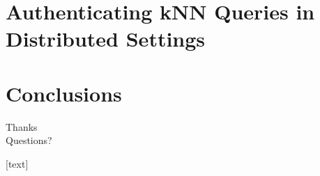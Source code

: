 \documentclass[xcolor={dvipsnames},aspectratio=169,10pt]{beamer}
\begin{document}
\section{Authenticating {kNN} Queries in Distributed Settings}

\section{Conclusions}

\begin{frame}[standout]
  Thanks \\
  Questions?
\end{frame}

\appendix%

\begingroup
{}
\begin{frame}[t,allowframebreaks]{\refname}
  [text]
  \renewcommand*{\bibfont}{\scriptsize}
  \printbibliography%
\end{frame}
\endgroup
\end{document}
